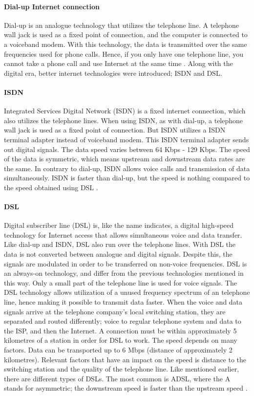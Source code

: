 \paragraph{Dial-up Internet connection}
Dial-up is an analogue technology that utilizes the telephone line. A telephone wall jack is used as a fixed point of connection, and the computer is connected to a voiceband modem. With this technology, the data is transmitted over the same frequencies used for phone calls. Hence, if you only have one telephone line, you cannot take a phone call and use Internet at the same time \cite{differentuplinks}. Along with the digital era, better internet technologies were introduced; ISDN and DSL. 

\paragraph{ISDN}
Integrated Services Digital Network (ISDN) is a fixed internet connection, which also utilizes the telephone lines. When using ISDN, as with dial-up, a telephone wall jack is used as a fixed point of connection. But ISDN utilizes a ISDN terminal adapter instead of voiceband modem. This ISDN terminal adapter sends out digital signals. The data speed varies between 64 Kbps - 129 Kbps. The speed of the data is symmetric, which means upstream and downstream data rates are the same. In contrary to dial-up, ISDN allows voice calls and transmission of data simultaneously. ISDN is faster than dial-up, but the speed is nothing compared to the speed obtained using DSL \cite{differentuplinks}. 

\paragraph{DSL}
Digital subscriber line (DSL) is, like the name indicates, a digital high-speed technology for Internet access that allows simultaneous voice and data transfer. Like dial-up and ISDN, DSL also run over the telephone lines. With DSL the data is not converted between analogue and digital signals. Despite this, the signals are modulated in order to be transferred on non-voice frequencies. DSL is an always-on technology, and differ from the previous technologies mentioned in this way. Only a small part of the telephone line is used for voice signals. The DSL technology allows utilization of a unused frequency spectrum of an telephone line, hence making it possible to transmit data faster. When the voice and data signals arrive at the telephone company's local switching station, they are separated and routed differently; voice to regular telephone system and data to the ISP, and then the Internet. A connection must be within approximately 5 kilometres of a station in order for DSL to work. The speed depends on many factors. Data can be transported up to 6 Mbps (distance of approximately 2 kilometres). Relevant factors that have an impact on the speed is distance to the switching station and the quality of the telephone line. Like mentioned earlier, there are different types of DSLs. The most common is ADSL, where the A stands for asymmetric; the downstream speed is faster than the upstream speed \cite{differentuplinks}.

